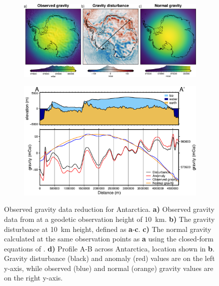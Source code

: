 \begin{figure}[!ht]
  \centering
    \begin{subfigure}[t]{.9\textwidth}
        \centering
        \includegraphics[width=\textwidth]{figures/chp4/antarctic_gravity_disturbance_with_profile}
    \end{subfigure}
    \begin{subfigure}[t]{.7\textwidth}
        \addtocounter{subfigure}{3}
        \centering
        \includegraphics[width=\textwidth]{figures/chp4/antarctic_gravity_profile}
        \caption{}
    \end{subfigure}
  \caption[Observed gravity data reduction for Antarctica]{Observed gravity data reduction for Antarctica. \textbf{a)} Observed gravity data from \citet{försteeigen6c42014} at a geodetic observation height of 10~km. \textbf{b)} The gravity disturbance at 10~km height, defined as \textbf{a}-\textbf{c}. \textbf{c)} The normal gravity calculated at the same observation points as \textbf{a} using the closed-form equations of \citet{liellipsoid2001}. \textbf{d)} Profile A-B across Antarctica, location shown in \textbf{b}. Gravity disturbance (black) and anomaly (red) values are on the left y-axis, while observed (blue) and normal (orange) gravity values are on the right y-axis.}
    \label{fig:chp4_antarctic_gravity_reduction}
\end{figure}

